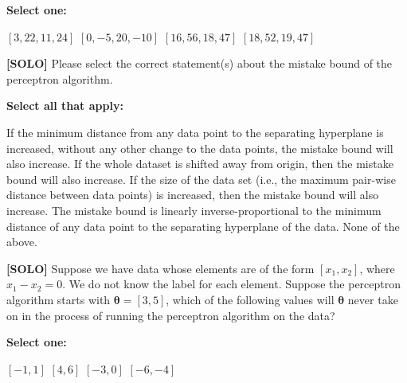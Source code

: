 \documentclass[11pt,addpoints,answers]{exam}
\begin{document}
\begin{questions}
    \textbf{Select one:}
    \begin{checkboxes}
        \choice $[3,22,11,24]$ 
        \choice $[0,-5,20,-10]$ 
        \choice $[16,56,18,47]$ 
        \CorrectChoice $[18,52,19,47]$ 
    \end{checkboxes}
    
    
    
    

    
    \question[2] \textbf{[SOLO]} Please select the correct statement(s) about the mistake bound of the perceptron algorithm. 

    \textbf{Select all that apply:}
    {%
    \checkboxchar{$\Box$} \checkedchar{$\blacksquare$}
    \begin{checkboxes}
        \choice If the minimum distance from any data point to the separating hyperplane is increased, without any other change to the data points, the mistake bound will also increase.
        \CorrectChoice If the whole dataset is shifted away from origin, then the mistake bound will also increase.
        \choice If the size of the data set (i.e., the maximum pair-wise distance between data points) is increased, then the mistake bound will also increase.
        \choice The mistake bound is linearly inverse-proportional to the minimum distance of any data point to the separating hyperplane of the data.
        \choice None of the above.
    \end{checkboxes}
    }



    \clearpage

    \question[2] \textbf{[SOLO]} Suppose we have data whose elements are of the form $[x_1,x_2]$, where $x_1 - x_2 = 0$. We do not know the label for each element. Suppose the perceptron algorithm starts with $\bm{\theta} = [3,5]$, which of the following values will $\bm{\theta}$ never take on in the process of running the perceptron algorithm on the data?

    \textbf{Select one:}
    \begin{checkboxes}
        \choice $[-1,1]$
        \choice $[4,6]$
        \CorrectChoice $[-3,0]$
        \choice $[-6,-4]$
    \end{checkboxes}


\end{questions}
\end{document}
